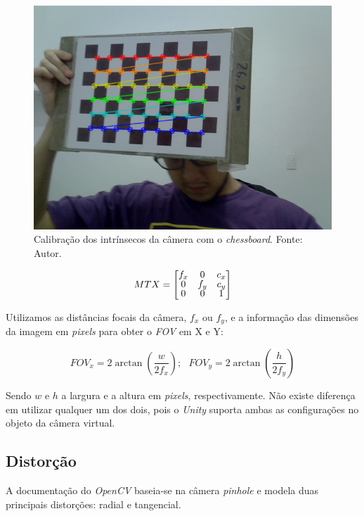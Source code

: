 \begin{figure}[ht]
    \centering
    \includegraphics[width=.45\linewidth]{figuras/chessboard.png}
    \caption{Calibração dos intrínsecos da câmera com o \textit{chessboard}. Fonte: Autor.}
    \label{fig:chess_calib}
\end{figure}

\[ MTX = 
\renewcommand\arraystretch{.8}
\begin{bmatrix}
    f_x & 0 & c_x \\
    0 & f_y & c_y \\
    0 & 0 & 1
\end{bmatrix} \]

Utilizamos as distâncias focais da câmera, \(f_x\) ou \(f_y\), e a informação das dimensões da imagem em \textit{pixels} para obter o \textit{FOV} em X e Y: 

\[
FOV_x = 2 \arctan \left( \dfrac{w}{2f_x} \right) ;
\ \ \ FOV_y = 2 \arctan \left( \dfrac{h}{2f_y} \right) 
\]
    
Sendo \(w\) e \(h\) a largura e a altura em \textit{pixels}, respectivamente. Não existe diferença em utilizar qualquer um dos dois, pois o \textit{Unity} suporta ambas as configurações no objeto da câmera virtual.
    
\subsection{Distorção}

A documentação do \textit{OpenCV} baseia-se na câmera \textit{pinhole} e modela duas principais distorções: radial e tangencial. 

